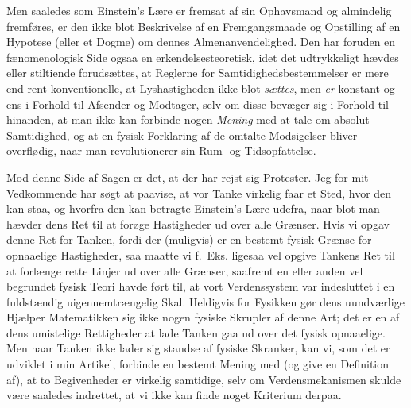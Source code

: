 \documentclass[12pt,a4paper]{article}
\newcommand{\opage}[1]{\marginnote{\footnotesize\textit{[#1]}}}
\begin{document}
Men saaledes som Einstein's Lære er fremsat af sin Ophavsmand og almindelig
fremføres, er den ikke blot Beskrivelse af en Fremgangsmaade og Opstilling af
en Hypotese (eller et Dogme) om dennes Almenanvendelighed. Den har foruden en
fænomenologisk Side ogsaa en erkendelsesteoretisk, idet det udtrykkeligt
hævdes eller stiltiende forudsættes, at Reglerne for Samtidighedsbestemmelser
er mere end rent konventionelle, at Lyshastigheden ikke blot \emph{sættes},
men \emph{er} konstant og ens i Forhold til Afsender og Modtager, selv om
disse bevæger sig i Forhold til hinanden, at man ikke kan forbinde nogen
\emph{Mening} med at tale om absolut Samtidighed, og at en fysisk Forklaring
af de omtalte Modsigelser bliver overflødig, naar man revolutionerer sin
Rum- og Tidsopfattelse.

Mod denne Side af Sagen er det, at der har rejst sig Protester. Jeg for mit
Vedkommende har søgt at paavise, at vor Tanke virkelig faar \guillemotleft et
Sted, hvor den kan staa\guillemotright, og hvorfra den kan betragte
Einstein's Lære udefra, naar blot man hævder dens Ret til at forøge
Hastigheder ud over alle Grænser. Hvis vi opgav denne Ret for Tanken, fordi
der (muligvis) er en bestemt fysisk Grænse for opnaaelige Hastigheder, saa
maatte vi f.~Eks. ligesaa vel opgive Tankens Ret til
\opage{167} at forlænge rette Linjer ud over alle Grænser, saafremt en eller anden vel
begrundet fysisk Teori havde ført til, at vort Verdenssystem var indesluttet
i en fuldstændig uigennemtrængelig Skal. Heldigvis for Fysikken gør dens
uundværlige Hjælper Matematikken sig ikke nogen fysiske Skrupler af denne
Art; det er en af dens umistelige Rettigheder at lade Tanken gaa ud over det
fysisk opnaaelige. Men naar Tanken ikke lader sig standse af fysiske
Skranker, kan vi, som det er udviklet i min Artikel, forbinde en bestemt
Mening med (og give en Definition af), at to Begivenheder er virkelig
samtidige, selv om Verdensmekanismen skulde være saaledes indrettet, at vi
ikke kan finde noget Kriterium derpaa.
\end{document}
